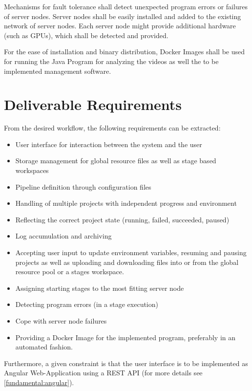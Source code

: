 Mechanisms for fault tolerance shall detect unexpected program errors or failures of server nodes.
Server nodes shall be easily installed and added to the existing network of server nodes.
Each server node might provide additional hardware (such as GPUs), which shall be detected and provided.

For the ease of installation and binary distribution, Docker Images shall be used for running the Java Program for analyzing the videos as well the to be implemented management software.





\section{Deliverable Requirements}

From the desired workflow, the following requirements can be extracted:

\begin{itemize}
	\item User interface for interaction between the system and the user
	\item Storage management for global resource files as well as stage based workspaces
	\item Pipeline definition through configuration files
	\item Handling of multiple projects with independent progress and environment
	\item Reflecting the correct project state (running, failed, succeeded, paused)
	\item Log accumulation and archiving
	\item Accepting user input to update environment variables, resuming and pausing projects as well as uploading and downloading files into or from the global resource pool or a stages workspace.
	\item Assigning starting stages to the most fitting server node
	\item Detecting program errors (in a stage execution)
	\item Cope with server node failures
	\item Providing a Docker Image for the implemented program, preferably in an automated fashion.
\end{itemize}

Furthermore, a given constraint is that the user interface is to be implemented as Angular Web-Application using a REST API (for more details see \autoref{fundamental:angular}).

